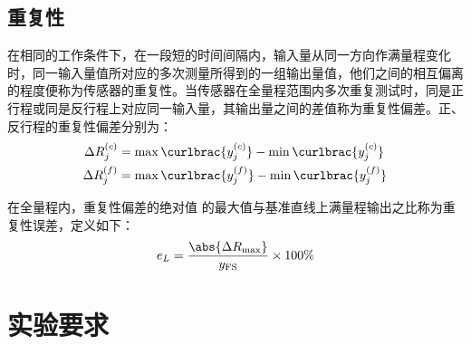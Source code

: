 \documentclass[a4paper,12pt,twoside]{article}%
\begin{document}
\subsection{重复性}
在相同的工作条件下，在一段短的时间间隔内，输入量从同一方向作满量程变化时，同一输入量值所对应的多次测量所得到的一组输出量值，他们之间的相互偏离的程度便称为传感器的重复性。当传感器在全量程范围内多次重复测试时，同是正行程或同是反行程上对应同一输入量，其输出量之间的差值称为重复性偏差。正、反行程的重复性偏差分别为：
\begin{equation}
\begin{aligned}
  \Delta R^{(c)}_j &= \max\curlbrac{y_j^{(c)}} - \min\curlbrac{y_j^{(c)}}\\
  \Delta R^{(f)}_j &= \max\curlbrac{y_j^{(f)}} - \min\curlbrac{y_j^{(f)}}
\end{aligned}
\label{eq:repeatability}
\end{equation}\par
在全量程内，重复性偏差的绝对值 的最大值与基准直线上满量程输出之比称为重复性误差，定义如下：
\begin{equation*}
  e_L= \frac{\abs{\Delta R_\mathrm{max}}}{y_\mathrm{FS}} \times 100\%
\end{equation*}\par
\newpage
\section{实验要求}
\end{document}
